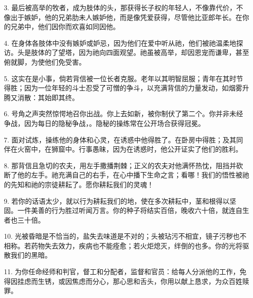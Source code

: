 3. 最后被高举的牧者，成为肢体的头，那获得长子权的年轻人，不像靠代价，不像出于嫉妒，他的兄弟肋未人嫉妒他，而是像凭爱获得，尽管他比亚郎年长。在你的兄弟中，他们因你而欢喜如同因他。\par

4. 在身体各肢体中没有嫉妒或妒忌，因为他们在爱中听从祂，他们被祂温柔地探访。头是肢体的了望塔，因为祂向四面观望。祂虽被高举，却因恩宠而谦卑，甚至俯就脚，为使他们免受害。\par

5. 这实在是小事，倘若背信被一位长者克服。老年以其明智屈服；青年在其时节得胜；因为一位年轻的斗士忍受了可憎的争斗，以充满背信的力量发动，如烟雾升腾又消散：其始即其终。\par

6. 号角之声突然惊愕地召你出战。你上去如新，被你制伏了第二个。你并非未经争战，因为每日的隐秘争战，。隐秘的操练常在公开场合获得冠冕。\par

7. 面对试炼，操练他的身体和心灵，在诱惑中他得胜了。在卧房中得胜；及其同伴在火窑中，在狮窟中。行事愚昧，因为在诱惑时，他公开证实了他们的胜利。\par

8. 那背信且急切的农夫，用左手撒播荆棘；正义的农夫对他满怀热忱，阻挡并砍断了他的左手。祂充满自己的右手，在心中播下生命之言；看哪！我们的悟性被祂的先知和祂的宗徒耕耘了。愿你耕耘我们的灵魂！\par

9. 若你的话语太少，就以行为耕耘我们的地，使在多次耕耘中，茎和根得以坚固。一件美善的行为胜过听闻万言。你的种子将结实百倍，晚收六十倍，就连自生者也三十倍。\par

10. 光被昏暗是不恰当的，盐失去味道是不对的；头被玷污不相宜，镜子污秽也不相称。若药物失去效力，疾病也不能痊愈；若火炬熄灭，绊倒的也多。你的光将驱散我们的黑暗。\par

11. 为你任命经师和判官，督工和分配者，监督和官员：给每人分派他的工作，免得因挂虑而生锈，或因焦虑而分心，那心思和舌头，你用以献上恳求，为众百姓赎罪。\par

